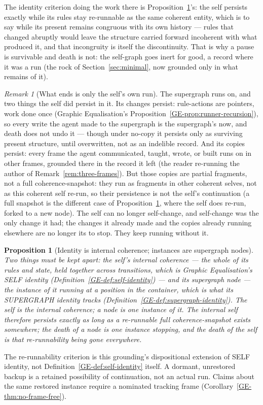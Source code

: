 \documentclass[11pt,a4paper]{article}
\newtheorem{proposition}[definition]{Proposition}
\theoremstyle{remark}\newtheorem{remark}[definition]{Remark}
\begin{document}
The identity criterion doing the work there is Proposition~\ref{prop:identity}'s: the
self persists exactly while its rules stay re-runnable as the same coherent entity,
which is to say while its present remains congruous with its own history --- rules that
changed abruptly would leave the structure carried forward incoherent with what produced
it, and that incongruity is itself the discontinuity. That is why a pause is survivable
and death is not: the self-graph goes inert for good, a record where it was a run (the
rock of Section~\ref{sec:minimal}, now grounded only in what remains of it).

\begin{remark}[What ends is only the self's own run]\label{rem:death-persists}
The supergraph runs on, and two things the self
did persist in it. Its changes persist: rule-actions are pointers, work done once
(Graphic Equalisation's Proposition~\ref{GE-prop:runner-recursion}), so
every write the agent made to the supergraph is the supergraph's now, and death does not
undo it --- though under no-copy it persists only as surviving present structure, until
overwritten, not as an indelible record. And its copies persist: every frame the agent communicated,
taught, wrote, or built runs on in other frames, grounded there in the record it left
(the reader re-running the author of Remark~\ref{rem:three-frames}). But those copies
are partial fragments, not a full coherence-snapshot: they run as fragments in other
coherent selves, not as this coherent self re-run, so their persistence is not the
self's continuation (a full snapshot is the different case of Proposition~\ref{prop:identity},
where the self does re-run, forked to a new node). The
self can no longer self-change, and self-change was the only change it had; the changes
it already made and the copies already running elsewhere are no longer its to stop.
They keep running without it.
\end{remark}

\begin{proposition}[Identity is internal coherence; instances are supergraph nodes]\label{prop:identity}
Two things must be kept apart: the self's \emph{internal coherence} --- the whole of its
rules and state, held together across transitions, which is Graphic Equalisation's SELF identity
(Definition~\ref{GE-def:self-identity}) --- and its
\emph{supergraph node} --- the instance of it running at a position in the container,
which is what its SUPERGRAPH identity tracks (Definition~\ref{GE-def:supergraph-identity}). The self is the internal
coherence; a node is one instance of it. The internal self therefore persists exactly as
long as a re-runnable full coherence-snapshot exists somewhere; the death of a node is one
instance stopping, and the death of the self is that re-runnability being gone everywhere.
\end{proposition}
The re-runnability criterion is this grounding's dispositional extension of
SELF identity, not Definition~\ref{GE-def:self-identity} itself. A dormant,
unrestored backup is a retained possibility of continuation, not an actual
run. Claims about the same restored instance require a nominated tracking
frame (Corollary~\ref{GE-thm:no-frame-free}).
\end{document}
